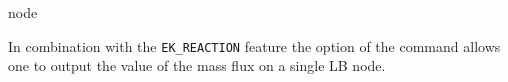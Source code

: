 \begin{essyntax}
  node    
  \begin{features}
  \end{features}
\end{essyntax}
In combination with the \texttt{EK\_REACTION} feature the  option of 
the  command allows one to output the value of the mass 
flux on a single LB node.

